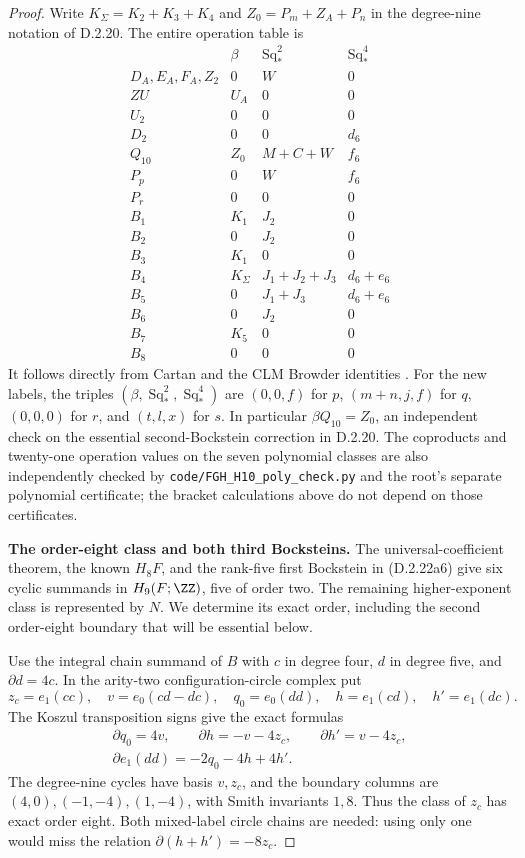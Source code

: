 \begin{proof}
Write $K_\Sigma=K_2+K_3+K_4$ and
$Z_0=P_m+Z_A+P_n$ in the degree-nine notation of
\textup{D.2.20}. The entire operation table is
\[
\begin{array}{c|ccc}
 &\beta&\operatorname{Sq}_*^2&\operatorname{Sq}_*^4\\\hline
 D_A,E_A,F_A,Z_2&0&W&0\\
 ZU&U_A&0&0\\
 U_2&0&0&0\\
 D_2&0&0&d_6\\
 Q_{10}&Z_0&M+C+W&f_6\\
 P_p&0&W&f_6\\
 P_r&0&0&0\\
 B_1&K_1&J_2&0\\
 B_2&0&J_2&0\\
 B_3&K_1&0&0\\
 B_4&K_\Sigma&J_1+J_2+J_3&d_6+e_6\\
 B_5&0&J_1+J_3&d_6+e_6\\
 B_6&0&J_2&0\\
 B_7&K_5&0&0\\
 B_8&0&0&0
\end{array}
\tag{D.2.22a6}
\]
It follows directly from Cartan and the CLM Browder identities
\cite[Chapter III, Theorems 1.2--1.4]{I_CohenLadaMay1976}.
For the new labels, the triples $(\beta,\operatorname{Sq}_*^2,
\operatorname{Sq}_*^4)$ are $(0,0,f)$ for $p$,
$(m+n,j,f)$ for $q$, $(0,0,0)$ for $r$, and $(t,l,x)$ for $s$.
In particular $\beta Q_{10}=Z_0$, an independent check on the
essential second-Bockstein correction in \textup{D.2.20}.
The coproducts and twenty-one operation values on the seven
polynomial classes are also independently checked by
\texttt{code/FGH\_H10\_poly\_check.py} and the root's separate
polynomial certificate; the bracket calculations above do not
depend on those certificates.

\medskip\noindent
\textbf{The order-eight class and both third Bocksteins.}
The universal-coefficient theorem, the known $H_8F$, and the
rank-five first Bockstein in \textup{(D.2.22a6)} give six cyclic
summands in $H_9(F;\ZZ)$, five of order two. The remaining
higher-exponent class is represented by $N$.
We determine its exact order, including the second order-eight
boundary that will be essential below.

Use the integral chain summand of $B$ with $c$ in degree four,
$d$ in degree five, and $\partial d=4c$. In the arity-two
configuration-circle complex put
\[
 z_c=e_1(cc),\quad v=e_0(cd-dc),\quad
 q_0=e_0(dd),\quad h=e_1(cd),\quad h'=e_1(dc).
\]
The Koszul transposition signs give the exact formulas
\[
\begin{gathered}
 \partial q_0=4v,\qquad
 \partial h=-v-4z_c,\qquad
 \partial h'=v-4z_c,\\
 \partial e_1(dd)=-2q_0-4h+4h'.
\end{gathered}
\tag{D.2.22a7}
\]
The degree-nine cycles have basis $v,z_c$, and the boundary
columns are $(4,0),(-1,-4),(1,-4)$, with Smith invariants
$1,8$. Thus the class of $z_c$ has exact order eight.
Both mixed-label circle chains are needed: using only one
would miss the relation $\partial(h+h')=-8z_c$.


\end{proof}
